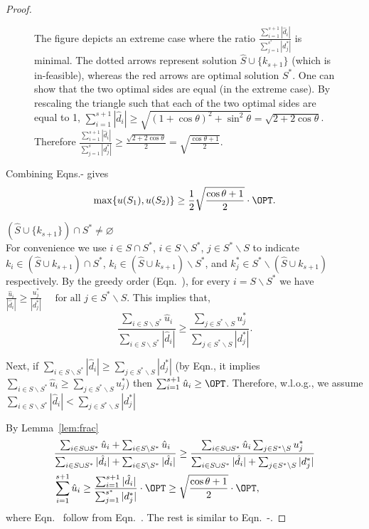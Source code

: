 \begin{proof}
\begin{figure}[!ht]
\begin{center}
	\end{center}
\caption{The figure depicts an extreme case where the ratio  $\frac{\sum_{i=1}^{s+1} |\hat d_i|}{\sum_{j = 1}^{s^*} |d^*_j|}$ is minimal. The dotted arrows represent solution $\hat S \cup \{k_{s+1}\}$ (which is in-feasible), whereas the red arrows are  optimal solution $S^*$. One can show that the two optimal sides are equal (in the extreme case). By rescaling the triangle such that each of the two optimal sides are equal to 1, $\sum_{i=1}^{s+1}|\hat d_i| \ge \sqrt{(1+\cos \theta)^2 + \sin^2 \theta} = \sqrt{2 + 2\cos \theta}$. Therefore $\frac{\sum_{i=1}^{s+1} |\hat d_i|}{\sum_{j = 1}^s |d^*_j|} \ge \frac{\sqrt{2 + 2\cos \theta}}{2}=\sqrt{\frac{\cos \theta + 1}{2}}$.}
	\label{fig:greedy}
\end{figure}  
  Combining Eqns.- gives
 \begin{equation}
  \max\{u(S_1), u(S_2)\} \ge \frac{1}{2} \sqrt{\frac{\cos \theta + 1}{2}} \cdot \OPT. \label{eq:g.3.5}
 \end{equation}
 
 $(\hat S \cup \{k_{s+1}\}) \cap S^* \neq \varnothing$\\
For convenience we use $i \in  S\cap S^* $, $i \in  S\backslash S^* $, $j \in S^*\backslash  S $ to indicate $k_i \in  (\hat S \cup {k_{s+1}} )\cap S^*$,  $k_i \in  (\hat S \cup {k_{s+1}} )\backslash S^*$, and  $k^*_j \in  S^*\backslash (\hat S \cup {k_{s+1}} )$ respectively.
   By the greedy order (Eqn.~), for every $i= S\backslash S^*$ we have
$\frac{\hat u_i}{|\hat d_i|}\ge \frac{u^*_j}{|d^*_j|} \quad \text{ for all } j \in S^*\backslash  S$.
 This implies that,
 \begin{equation}
  \frac{ \sum_{i\in  S \backslash S^*} \hat u_i}{ \sum_{i\in  S \backslash S^* }|\hat d_i|}  \ge \frac{\sum_{j \in S^*\backslash  S} u^*_j} {\sum_{j \in S^*\backslash  S} |d^*_j|}. \label{eq:g.4}
 \end{equation}

Next, if $\sum_{i\in  S \backslash S^*}  |\hat d_i| \ge \sum_{j \in S^*\backslash  S} |d^*_j|$ (by Eqn., it implies $\sum_{i\in  S \backslash S^*} \hat u_i \ge \sum_{j \in S^*\backslash  S} u^*_j$) then $\sum_{i=1}^{s+1} \hat u_i \ge \OPT$. Therefore, w.l.o.g., we assume   $\sum_{i\in  S \backslash S^*}  |\hat d_i| < \sum_{j \in S^*\backslash  S} |d^*_j|$
 
 By Lemma~\ref{lem:frac}
 \begin{align}
& \frac{\sum_{i\in  S  \cup S^*} \hat u_i +  \sum_{i\in  S \backslash S^*} \hat u_i}{ \sum_{i\in  S  \cup S^*} |\hat d_i| + \sum_{i\in  S \backslash S^* }|\hat d_i|}  \ge \frac{\sum_{i\in  S  \cup S^*} \hat u_i \sum_{j \in S^*\backslash  S} u^*_j} {\sum_{i\in  S  \cup S^*} |\hat d_i|  + \sum_{j \in S^*\backslash  S} |d^*_j|}\\
 & \sum_{i=1}^{s+1} \hat u_i \ge  \frac{ \sum_{i=1}^{s+1}|\hat d_i|} {\sum_{j = 1}^{s^*} |d^*_j|}\cdot  \OPT \ge \sqrt{\frac{\cos \theta + 1}{2}} \cdot \OPT \label{eq:g.5},
 \end{align}
 where Eqn.~ follow from Eqn.~. The rest is similar to Eqn.~-.
 

\end{proof}
